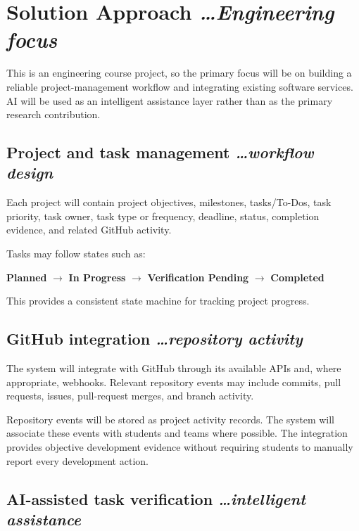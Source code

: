 \documentclass[11pt,a4paper]{article}
\newcommand{\BvrHint}[1]{%
  \texorpdfstring{%
    {\normalfont\normalsize\itshape\hfill #1}%
  }{}%
}
\begin{document}
\section{Solution Approach%
  \BvrHint{\ldots Engineering focus}}

This is an engineering course project, so the primary focus will be on building a reliable project-management workflow and integrating existing software services. AI will be used as an intelligent assistance layer rather than as the primary research contribution.


\subsection{Project and task management%
  \BvrHint{\ldots workflow design}}

Each project will contain project objectives, milestones, tasks/To-Dos, task priority, task owner, task type or frequency, deadline, status, completion evidence, and related GitHub activity.

Tasks may follow states such as:

\begin{center}
\textbf{Planned}
$\rightarrow$
\textbf{In Progress}
$\rightarrow$
\textbf{Verification Pending}
$\rightarrow$
\textbf{Completed}
\end{center}

This provides a consistent state machine for tracking project progress.


\subsection{GitHub integration%
  \BvrHint{\ldots repository activity}}

The system will integrate with GitHub through its available APIs and, where appropriate, webhooks. Relevant repository events may include commits, pull requests, issues, pull-request merges, and branch activity.

Repository events will be stored as project activity records. The system will associate these events with students and teams where possible. The integration provides objective development evidence without requiring students to manually report every development action.


\subsection{AI-assisted task verification%
  \BvrHint{\ldots intelligent assistance}}
\end{document}
